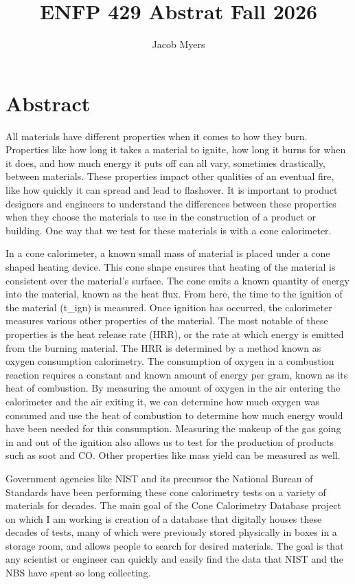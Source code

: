\documentclass{abstract}
\title{ENFP 429 Abstrat Fall 2026}
\author{Jacob Myers}
\begin{document}
\maketitle
\section{Abstract}
All materials have different properties when it comes to how they burn. Properties like how long it takes a material to ignite, how long it burns for when it does, and how much energy it puts off can all vary, sometimes drastically, between materials. These properties impact other qualities of an eventual fire, like how quickly it can spread and lead to flashover. It is important to product designers and engineers to understand the differences between these properties when they choose the materials to use in the construction of a product or building. One way that we test for these materials is with a cone calorimeter.

In a cone calorimeter, a known small mass of material is placed under a cone shaped heating device. This cone shape ensures that heating of the material is consistent over the material's surface. The cone emits a known quantity of energy into the material, known as the heat flux. From here, the time to the ignition of the material (t\_ign) is measured. Once ignition has occurred, the calorimeter measures various other properties of the material. The most notable of these properties is the heat release rate (HRR), or the rate at which energy is emitted from the burning material. The HRR is determined by a method known as oxygen consumption calorimetry. The consumption of oxygen in a combustion reaction requires a constant and known amount of energy per gram, known as its heat of combustion. By measuring the amount of oxygen in the air entering the calorimeter and the air exiting it, we can determine how much oxygen was consumed and use the heat of combustion to determine how much energy would have been needed for this consumption. Measuring the makeup of the gas going in and out of the ignition also allows us to test for the production of products such as soot and CO. Other properties like mass yield can be measured as well.

Government agencies like NIST and its precursor the National Bureau of Standards have been performing these cone calorimetry tests on a variety of materials for decades. The main goal of the Cone Calorimetry Database project on which I am working is creation of a database that digitally houses these decades of tests, many of which were previously stored physically in boxes in a storage room, and allows people to search for desired materials. The goal is that any scientist or engineer can quickly and easily find the data that NIST and the NBS have spent so long collecting.
\end{document}
